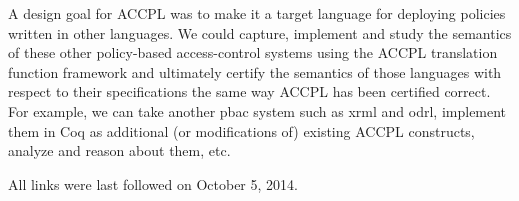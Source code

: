 \documentclass[runningheads,a4paper]{llncs}
\begin{document}
A design goal for \ac{ACCPL} was to make it a target language for deploying policies written in other languages. We could capture, implement and study the semantics of these other policy-based access-control systems using the \ac{ACCPL} translation function framework and ultimately certify the semantics of those languages with respect to their specifications the same way \ac{ACCPL} has been certified correct. For example, we can take another \ac{pbac} system such as \ac{xrml} and \ac{odrl}, implement them in Coq as additional (or modifications of) existing \ac{ACCPL} constructs, analyze and reason about them, etc. 






All links were last followed on October 5, 2014.
\end{document}
